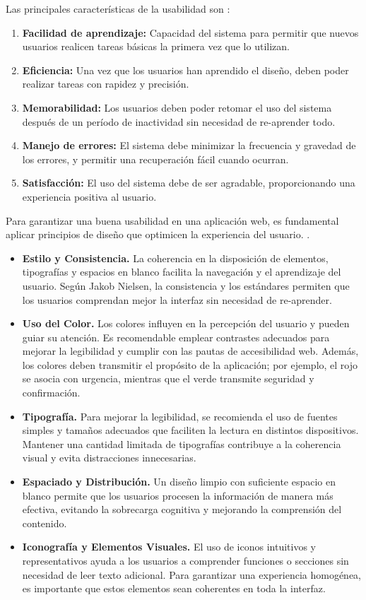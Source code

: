 Las principales características de la usabilidad son \cite{coursera2023}:  
\begin{enumerate}
    \item \textbf{Facilidad de aprendizaje:} Capacidad del sistema para permitir que nuevos usuarios realicen tareas básicas la primera vez que lo utilizan. 
    \item \textbf{Eficiencia:} Una vez que los usuarios han aprendido el diseño, deben poder realizar tareas con rapidez y precisión. 
    \item \textbf{Memorabilidad:} Los usuarios deben poder retomar el uso del sistema después de un período de inactividad sin necesidad de re-aprender todo. 
    \item \textbf{Manejo de errores:} El sistema debe minimizar la frecuencia y gravedad de los errores, y permitir una recuperación fácil cuando ocurran.
    \item \textbf{Satisfacción:} El uso del sistema debe de ser agradable, proporcionando una experiencia positiva al usuario.
\end{enumerate}


Para garantizar una buena usabilidad en una aplicación web, es fundamental aplicar principios de diseño que optimicen la experiencia del usuario. \cite{nielsen1993} \cite{w3c1999}.

\begin{itemize}
    \item \textbf{Estilo y Consistencia.} La coherencia en la disposición de elementos, tipografías y espacios en blanco facilita la navegación y el aprendizaje del usuario. Según Jakob Nielsen, la consistencia y los estándares permiten que los usuarios comprendan mejor la interfaz sin necesidad de re-aprender.
    \item \textbf{Uso del Color.} Los colores influyen en la percepción del usuario y pueden guiar su atención. Es recomendable emplear contrastes adecuados para mejorar la legibilidad y cumplir con las pautas de accesibilidad web. Además, los colores deben transmitir el propósito de la aplicación; por ejemplo, el rojo se asocia con urgencia, mientras que el verde transmite seguridad y confirmación.
    \item \textbf{Tipografía.} Para mejorar la legibilidad, se recomienda el uso de fuentes simples y tamaños adecuados que faciliten la lectura en distintos dispositivos. Mantener una cantidad limitada de tipografías contribuye a la coherencia visual y evita distracciones innecesarias.
    \item \textbf{Espaciado y Distribución.} Un diseño limpio con suficiente espacio en blanco permite que los usuarios procesen la información de manera más efectiva, evitando la sobrecarga cognitiva y mejorando la comprensión del contenido.
    \item \textbf{Iconografía y Elementos Visuales.} El uso de iconos intuitivos y representativos ayuda a los usuarios a comprender funciones o secciones sin necesidad de leer texto adicional. Para garantizar una experiencia homogénea, es importante que estos elementos sean coherentes en toda la interfaz.
\end{itemize}


